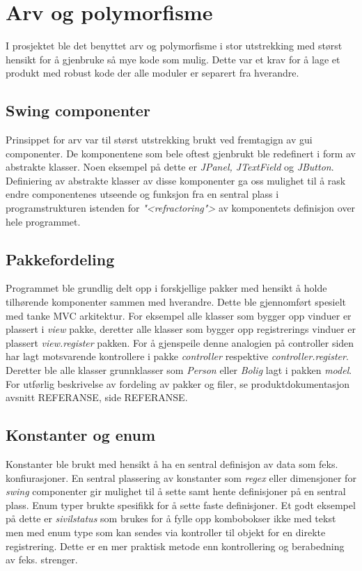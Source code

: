 \section{Arv og polymorfisme}
I prosjektet ble det benyttet arv og polymorfisme i stor utstrekking med størst hensikt for å gjenbruke så mye kode som mulig. Dette var et krav for å lage et produkt med robust kode der alle moduler er separert fra hverandre. 
\subsection{Swing componenter}
Prinsippet for arv var til størst utstrekking brukt ved fremtagign av gui componenter. De komponentene som bele oftest gjenbrukt ble redefinert i form av abstrakte klasser. Noen eksempel på dette er \emph{JPanel, JTextField} og \emph{JButton}. Definiering av abstrakte klasser av disse komponenter ga oss mulighet til å rask endre componentenes utseende og funksjon fra en sentral plass i programstrukturen istenden for \textit{"<refractoring">} av komponentets definisjon over hele programmet.  

\subsection{Pakkefordeling}
Programmet ble grundlig delt opp i forskjellige pakker med hensikt å holde tilhørende komponenter sammen med hverandre. Dette ble gjennomført spesielt med tanke MVC arkitektur. For eksempel alle klasser som bygger opp vinduer er plassert i \emph{view} pakke, deretter alle klasser som bygger opp registrerings vinduer er plassert \emph{view.register} pakken. For å gjenspeile denne analogien på controller siden har lagt motsvarende kontrollere i pakke \emph{controller} respektive \emph{controller.register}. Deretter ble alle klasser grunnklasser som \emph{Person} eller \emph{Bolig} lagt i pakken \emph{model}. For utførlig beskrivelse av fordeling av pakker og filer, se produktdokumentasjon avsnitt REFERANSE, side REFERANSE.

\subsection{Konstanter og enum}
Konstanter ble brukt med hensikt å ha en sentral definisjon av data som feks. konfiurasjoner. En sentral plassering av konstanter som \emph{regex} eller dimensjoner for \emph{swing} componenter gir mulighet til å sette samt hente definisjoner på en sentral plass. Enum typer brukte spesifikk for å sette faste definisjoner. Et godt eksempel på dette er \textit{sivilstatus} som brukes for å fylle opp kombobokser ikke med tekst men med enum type som kan sendes via kontroller til objekt for en direkte registrering. Dette er en mer praktisk metode enn kontrollering og berabedning av feks. strenger.    